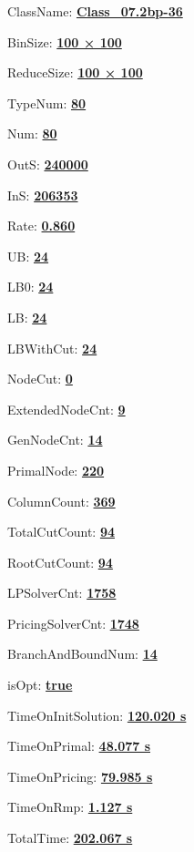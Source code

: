 \documentclass[11pt]{article}
\begin{document}
\pagestyle{empty}


ClassName: \underline{\textbf{Class_07.2bp-36}}
\par
BinSize: \underline{\textbf{100 × 100}}
\par
ReduceSize: \underline{\textbf{100 × 100}}
\par
TypeNum: \underline{\textbf{80}}
\par
Num: \underline{\textbf{80}}
\par
OutS: \underline{\textbf{240000}}
\par
InS: \underline{\textbf{206353}}
\par
Rate: \underline{\textbf{0.860}}
\par
UB: \underline{\textbf{24}}
\par
LB0: \underline{\textbf{24}}
\par
LB: \underline{\textbf{24}}
\par
LBWithCut: \underline{\textbf{24}}
\par
NodeCut: \underline{\textbf{0}}
\par
ExtendedNodeCnt: \underline{\textbf{9}}
\par
GenNodeCnt: \underline{\textbf{14}}
\par
PrimalNode: \underline{\textbf{220}}
\par
ColumnCount: \underline{\textbf{369}}
\par
TotalCutCount: \underline{\textbf{94}}
\par
RootCutCount: \underline{\textbf{94}}
\par
LPSolverCnt: \underline{\textbf{1758}}
\par
PricingSolverCnt: \underline{\textbf{1748}}
\par
BranchAndBoundNum: \underline{\textbf{14}}
\par
isOpt: \underline{\textbf{true}}
\par
TimeOnInitSolution: \underline{\textbf{120.020 s}}
\par
TimeOnPrimal: \underline{\textbf{48.077 s}}
\par
TimeOnPricing: \underline{\textbf{79.985 s}}
\par
TimeOnRmp: \underline{\textbf{1.127 s}}
\par
TotalTime: \underline{\textbf{202.067 s}}
\par
\newpage


\end{document}

